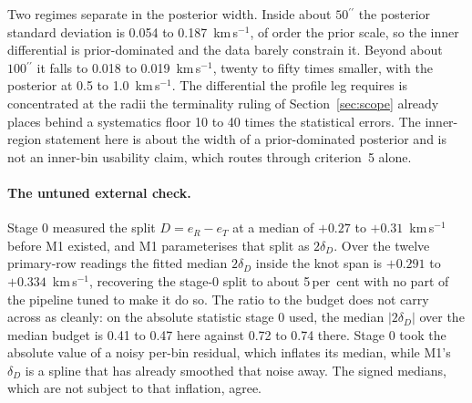 \documentclass[11pt]{article}
\newcommand{\as}{\ensuremath{^{\prime\prime}}}
\newcommand{\dD}{\ensuremath{\delta_D}}
\begin{document}
Two regimes separate in the posterior width. Inside about $50\as$ the posterior standard deviation is 0.054 to 0.187~km\,s$^{-1}$, of order the prior scale, so the inner differential is prior-dominated and the data barely constrain it. Beyond about $100\as$ it falls to 0.018 to 0.019~km\,s$^{-1}$, twenty to fifty times smaller, with the posterior at 0.5 to 1.0~km\,s$^{-1}$. The differential the profile leg requires is concentrated at the radii the terminality ruling of Section~\ref{sec:scope} already places behind a systematics floor 10 to 40 times the statistical errors. The inner-region statement here is about the width of a prior-dominated posterior and is not an inner-bin usability claim, which routes through criterion~5 alone.

\paragraph{The untuned external check.} Stage 0 measured the split $D = e_R - e_T$ at a median of $+0.27$ to $+0.31$~km\,s$^{-1}$ before M1 existed, and M1 parameterises that split as $2\dD$. Over the twelve primary-row readings the fitted median $2\dD$ inside the knot span is $+0.291$ to $+0.334$~km\,s$^{-1}$, recovering the stage-0 split to about 5\,per~cent with no part of the pipeline tuned to make it do so. The ratio to the budget does not carry across as cleanly: on the absolute statistic stage 0 used, the median $|2\dD|$ over the median budget is 0.41 to 0.47 here against 0.72 to 0.74 there. Stage 0 took the absolute value of a noisy per-bin residual, which inflates its median, while M1's \dD{} is a spline that has already smoothed that noise away. The signed medians, which are not subject to that inflation, agree.
\end{document}
